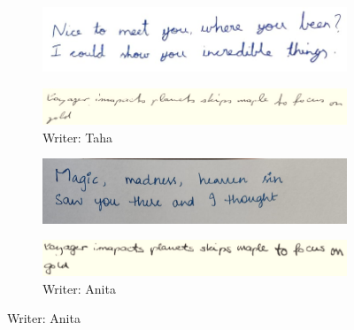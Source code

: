 \documentclass[10pt,twocolumn,letterpaper]{article}
\begin{document}
\begin{figure}[h]
  \centering
   \begin{subfigure}[b]{0.45\textwidth}
    \includegraphics[width=\textwidth]{../latex-src/Images/taha-1.jpeg}
    \label{fig:taha-input}
  \end{subfigure}
  \hfill
  \vspace*{-4mm}
  \begin{subfigure}[b]{0.45\textwidth}
    \includegraphics[width=\textwidth]{../latex-src/Images/Taha-output.png}
    \caption{{Writer: Taha}}
    \label{fig:taha-output}
  \end{subfigure}
  \hfill
  \vspace*{3mm}

  \begin{subfigure}[b]{0.45\textwidth}
    \includegraphics[width=\textwidth]{../latex-src/Images/anita-1.jpeg}
    \label{fig:anita-input}
  \end{subfigure}
  \hfill
  \vspace*{-3mm}
  \begin{subfigure}[b]{0.45\textwidth}
    \includegraphics[width=\textwidth]{../latex-src/Images/Anita-output.png}
    \caption{{Writer: Anita}}
    \label{fig:anita-output}
  \end{subfigure}
  \hfill
  \vspace*{3mm}


\end{figure}
\end{document}
